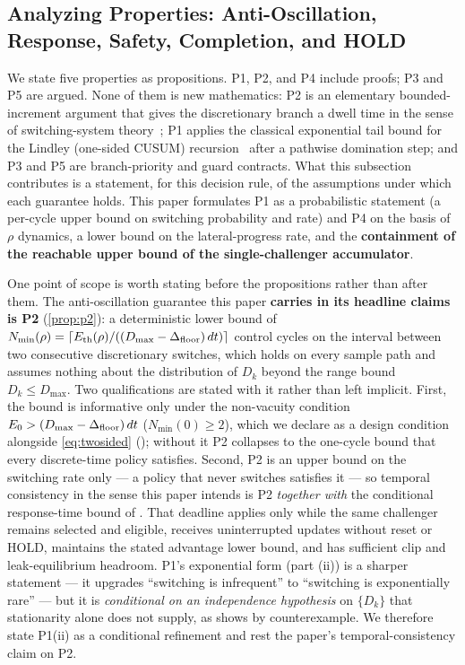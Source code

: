\subsection{Analyzing Properties: Anti-Oscillation, Response, Safety, Completion, and HOLD}\label{subsec:props}

We state five properties as propositions. P1, P2, and P4 include proofs; P3 and P5 are argued. None of them is new mathematics: P2 is an elementary bounded-increment argument that gives the discretionary branch a dwell time in the sense of switching-system theory~\citep{hespanha1999dwell}; P1 applies the classical exponential tail bound for the Lindley (one-sided CUSUM) recursion~\citep{lindley1952queue,kingman1970queues,page1954cusum} after a pathwise domination step; and P3 and P5 are branch-priority and guard contracts. What this subsection contributes is a statement, for this decision rule, of the assumptions under which each guarantee holds. This paper formulates P1 as a probabilistic statement (a per-cycle upper bound on switching probability and rate) and P4 on the basis of $\rho$ dynamics, a lower bound on the lateral-progress rate, and the \textbf{containment of the reachable upper bound of the single-challenger accumulator}.

One point of scope is worth stating before the propositions rather than after them. The anti-oscillation guarantee this paper \textbf{carries in its headline claims is P2} (\cref{prop:p2}): a deterministic lower bound of $N_{\min}(\rho) = \lceil E_{\text{th}}(\rho)/((D_{\max}-\Delta_{\text{floor}})\,dt)\rceil$ control cycles on the interval between two consecutive discretionary switches, which holds on every sample path and assumes nothing about the distribution of $D_k$ beyond the range bound $D_k \le D_{\max}$. Two qualifications are stated with it rather than left implicit. First, the bound is informative only under the non-vacuity condition $E_0 > (D_{\max}-\Delta_{\text{floor}})\,dt$ ($N_{\min}(0) \ge 2$), which we declare as a design condition alongside \eqref{eq:twosided} (); without it P2 collapses to the one-cycle bound that every discrete-time policy satisfies. Second, P2 is an upper bound on the switching rate only --- a policy that never switches satisfies it --- so temporal consistency in the sense this paper intends is P2 \emph{together with} the conditional response-time bound of . That deadline applies only while the same challenger remains selected and eligible, receives uninterrupted updates without reset or HOLD, maintains the stated advantage lower bound, and has sufficient clip and leak-equilibrium headroom. P1's exponential form (part (ii)) is a sharper statement --- it upgrades ``switching is infrequent'' to ``switching is exponentially rare'' --- but it is \emph{conditional on an independence hypothesis} on $\{D_k\}$ that stationarity alone does not supply, as  shows by counterexample. We therefore state P1(ii) as a conditional refinement and rest the paper's temporal-consistency claim on P2.

